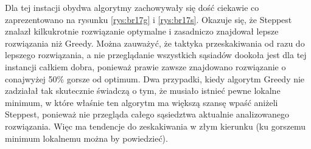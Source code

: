 Dla tej instacji obydwa algorytmy zachowywały się dość ciekawie co zaprezentowano na rysunku \ref{rys:br17g} i \ref{rys:br17s}. Okazuje się, że Steppest znalazł kilkukrotnie rozwiązanie optymalne i zasadniczo znajdował lepsze rozwiązania niż Greedy. Można zauważyć, że taktyka przeskakiwania od razu do lepszego rozwiązania, a nie przeglądanie wszystkich sąsiadów dookoła jest dla tej instancji całkiem dobra, ponieważ prawie zawsze znajdowano rozwiązanie o conajwyżej 50\% gorsze od optimum. Dwa przypadki, kiedy algorytm Greedy nie zadziałał tak skutecznie świadczą o tym, że musiało istnieć pewne lokalne minimum, w które właśnie ten algorytm ma większą szansę wpaść aniżeli Steppest, ponieważ nie przegląda całego sąsiedztwa aktualnie analizowanego rozwiązania. Więc ma tendencje do zeskakiwania w złym kierunku (ku gorszemu minimum lokalnemu można by powiedzieć).

